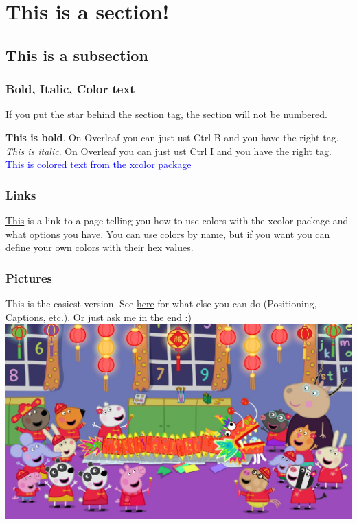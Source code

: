 \documentclass[../main.tex]{subfiles}
\begin{document}
\section{This is a section!}
\subsection{This is a subsection}

\subsubsection*{Bold, Italic, Color text}

If you put the star behind the section tag, the section will not be numbered.

\textbf{This is bold}. On Overleaf you can just ust Ctrl B and you have the right tag.
\textit{This is italic}. On Overleaf you can just ust Ctrl I and you have the right tag.
\textcolor{blue}{This is colored text from the xcolor package}

\subsubsection*{Links}
 
\href{https://ftp.agdsn.de/pub/mirrors/latex/dante/macros/latex/contrib/xcolor/xcolor.pdf}{This} is a link to a page telling you how to use colors with the xcolor package and what options you have. You can use colors by name, but if you want you can define your own colors with their hex values.
 
\subsubsection*{Pictures}

This is the easiest version. See \href{https://www.overleaf.com/learn/latex/Inserting_Images}{here} for what else you can do (Positioning, Captions, etc.). Or just ask me in the end :) \\

\includegraphics[width=\textwidth]{images/peppaPig.jpg}
\end{document}
